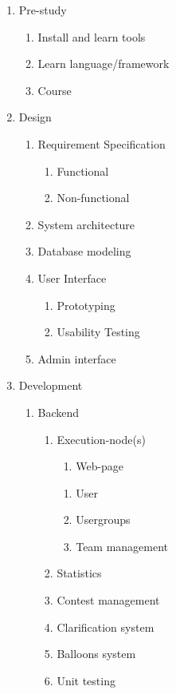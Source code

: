 \begin{mdframed}
\begin{enumerate}
        \item Pre-study        
        \begin{enumerate}
            \item Install and learn tools
            \item Learn language/framework
            \item Course
        \end{enumerate}
        \item Design
        \begin{enumerate}
            \item Requirement Specification
            \begin{enumerate}
                \item Functional
                \item Non-functional
            \end{enumerate}
            \item  System architecture
            \item Database modeling
            \item User Interface
            \begin{enumerate}
                \item Prototyping
                \item Usability Testing
            \end{enumerate}
            \item  Admin interface
        \end{enumerate}

        \item Development
        \begin{enumerate}
            \item  Backend
            \begin{enumerate}
                \item Execution-node(s)
                \begin{enumerate}
                    \item Web-page
                \end{enumerate}
            \begin{enumerate}
                \item User
                \item Usergroups
                \item Team management
            \end{enumerate}
            \item  Statistics
            \item Contest management 
            \item Clarification system
            \item Balloons system
            \item Unit testing
        \end{enumerate}


\end{enumerate}
\end{enumerate}
\end{mdframed}
